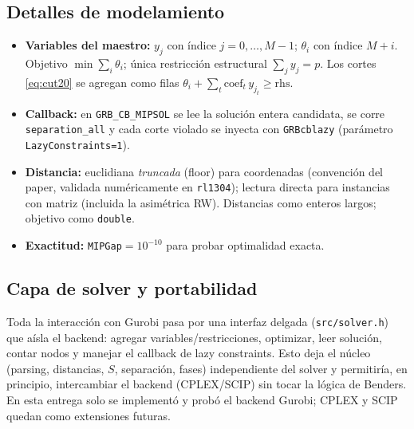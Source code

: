 \subsection{Detalles de modelamiento}
\begin{itemize}[noitemsep]
  \item \textbf{Variables del maestro:} $y_j$ con índice $j=0,\dots,M-1$; $\theta_i$ con índice
        $M+i$. Objetivo $\min\sum_i\theta_i$; única restricción estructural $\sum_j y_j=p$. Los
        cortes \eqref{eq:cut20} se agregan como filas $\theta_i + \sum_t \text{coef}_t\,y_{j_t}\ge
        \text{rhs}$.
  \item \textbf{Callback:} en \texttt{GRB\_CB\_MIPSOL} se lee la solución entera candidata, se
        corre \texttt{separation\_all} y cada corte violado se inyecta con \texttt{GRBcblazy}
        (parámetro \texttt{LazyConstraints=1}).
  \item \textbf{Distancia:} euclidiana \emph{truncada} (floor) para coordenadas (convención del
        paper, validada numéricamente en \texttt{rl1304}); lectura directa para instancias con
        matriz (incluida la asimétrica RW). Distancias como enteros largos; objetivo como
        \texttt{double}.
  \item \textbf{Exactitud:} \texttt{MIPGap}$=10^{-10}$ para probar optimalidad exacta.
\end{itemize}

\subsection{Capa de solver y portabilidad}
Toda la interacción con Gurobi pasa por una interfaz delgada (\texttt{src/solver.h}) que aísla el
backend: agregar variables/restricciones, optimizar, leer solución, contar nodos y manejar el
callback de lazy constraints. Esto deja el núcleo (parsing, distancias, $S$, separación, fases)
independiente del solver y permitiría, en principio, intercambiar el backend (CPLEX/SCIP) sin
tocar la lógica de Benders. En esta entrega solo se implementó y probó el backend Gurobi; CPLEX y
SCIP quedan como extensiones futuras.
